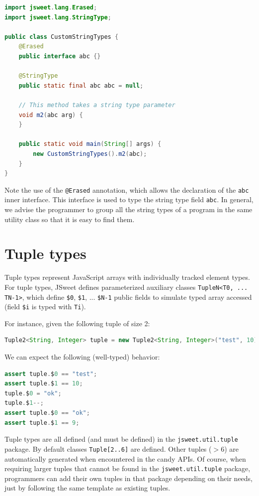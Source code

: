\documentclass[a4paper]{report}
\begin{document}
\begin{lstlisting}[language=Java]
import jsweet.lang.Erased;
import jsweet.lang.StringType;

public class CustomStringTypes {
	@Erased
	public interface abc {}
	
	@StringType
	public static final abc abc = null;

	// This method takes a string type parameter
	void m2(abc arg) {
	}
	
	public static void main(String[] args) {
		new CustomStringTypes().m2(abc);
	}
}
\end{lstlisting}

Note the use of the \texttt{@Erased} annotation, which allows the declaration of the \texttt{abc} inner interface. This interface is used to type the string type field \texttt{abc}. In general, we advise the programmer to group all the string types of a program in the same utility class so that it is easy to find them.

\section{Tuple types}

Tuple types represent JavaScript arrays with individually tracked element types. For tuple types, JSweet defines parameterized auxiliary classes \texttt{TupleN<T0, ... TN-1>}, which define \texttt{\$0}, \texttt{\$1}, ... \texttt{\$N-1} public fields to simulate typed array accessed (field \texttt{\$i} is typed with \texttt{Ti}).

For instance, given the following tuple of size 2:

\begin{lstlisting}[language=Java]
Tuple2<String, Integer> tuple = new Tuple2<String, Integer>("test", 10);
\end{lstlisting}

We can expect the following (well-typed) behavior:

\begin{lstlisting}[language=Java]
assert tuple.$0 == "test";
assert tuple.$1 == 10;
tuple.$0 = "ok";
tuple.$1--;
assert tuple.$0 == "ok";
assert tuple.$1 == 9;
\end{lstlisting}

Tuple types are all defined (and must be defined) in the \texttt{jsweet.\-util.\-tuple} package. By default classes \texttt{Tuple[2..6]} are defined. Other tuples ($>6$) are automatically generated when encountered in the candy APIs. Of course, when requiring larger tuples that cannot be found in the \texttt{jsweet.\-util.\-tuple} package, programmers can add their own tuples in that package depending on their needs, just by following the same template as existing tuples.
\end{document}
